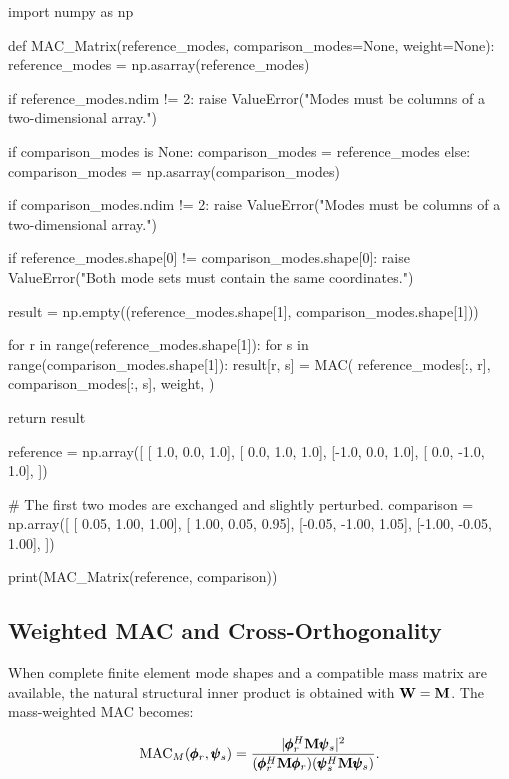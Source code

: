 \begin{python}
import numpy as np


def MAC_Matrix(reference_modes, comparison_modes=None, weight=None):
    reference_modes = np.asarray(reference_modes)

    if reference_modes.ndim != 2:
        raise ValueError("Modes must be columns of a two-dimensional array.")

    if comparison_modes is None:
        comparison_modes = reference_modes
    else:
        comparison_modes = np.asarray(comparison_modes)

    if comparison_modes.ndim != 2:
        raise ValueError("Modes must be columns of a two-dimensional array.")

    if reference_modes.shape[0] != comparison_modes.shape[0]:
        raise ValueError("Both mode sets must contain the same coordinates.")

    result = np.empty((reference_modes.shape[1], comparison_modes.shape[1]))

    for r in range(reference_modes.shape[1]):
        for s in range(comparison_modes.shape[1]):
            result[r, s] = MAC(
                reference_modes[:, r],
                comparison_modes[:, s],
                weight,
            )

    return result


reference = np.array([
    [ 1.0,  0.0,  1.0],
    [ 0.0,  1.0,  1.0],
    [-1.0,  0.0,  1.0],
    [ 0.0, -1.0,  1.0],
])

# The first two modes are exchanged and slightly perturbed.
comparison = np.array([
    [ 0.05,  1.00,  1.00],
    [ 1.00,  0.05,  0.95],
    [-0.05, -1.00,  1.05],
    [-1.00, -0.05,  1.00],
])

print(MAC_Matrix(reference, comparison))
\end{python}

\subsection{Weighted MAC and Cross-Orthogonality}

When complete finite element mode shapes and a compatible mass matrix are
available, the natural structural inner product is obtained with
$\mathbf{W}=\mathbf{M}$. The mass-weighted MAC becomes:

\begin{equation}\label{mass-weighted-mac}
    \operatorname{MAC}_{M}(\pmb{\phi}_r,\pmb{\psi}_s)
    =
    \frac{| {\pmb{\phi}_r^H\mathbf{M}\pmb{\psi}_s} |^2}
    {(\pmb{\phi}_r^H\mathbf{M}\pmb{\phi}_r)
     (\pmb{\psi}_s^H\mathbf{M}\pmb{\psi}_s)}.
\end{equation}

